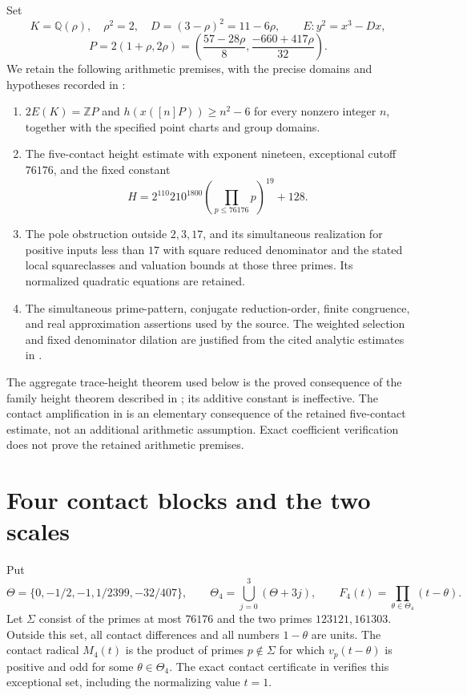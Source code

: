 \documentclass[11pt,a4paper]{article}
\newcommand{\Q}{\mathbb Q}\newcommand{\Z}{\mathbb Z}\newcommand{\HH}{\mathcal H}
\begin{document}
Set
\[
 K=\Q(\rho),\quad \rho^2=2,\quad D=(3-\rho)^2=11-6\rho,
 \qquad E:y^2=x^3-Dx,
\]
\[
 P=2(1+\rho,2\rho)
 =\left(\frac{57-28\rho}{8},\frac{-660+417\rho}{32}\right).
\]
We retain the following arithmetic premises, with the precise domains
and hypotheses recorded in \cite{Dependencies,Source,Weights}:
\begin{enumerate}
\item $2E(K)=\Z P$ and $h(x([n]P))\ge n^2-6$ for every nonzero
integer $n$, together with the specified point charts and group domains.
\item The five-contact height estimate with exponent nineteen,
exceptional cutoff $76176$, and the fixed constant
\[
 H=2^{110}210^{1800}\left(\prod_{p\le76176}p\right)^{19}+128.
\]
\item The pole obstruction outside $2,3,17$, and its simultaneous
realization for positive inputs less than $17$ with square reduced
denominator and the stated local squareclasses and valuation bounds
at those three primes. Its normalized quadratic equations are retained.
\item The simultaneous prime-pattern, conjugate reduction-order,
finite congruence, and real approximation assertions used by the source.
The weighted selection and fixed denominator dilation are justified
from the cited analytic estimates in \cite{Selection}.
\end{enumerate}
The aggregate trace-height theorem used below is the proved consequence
of the family height theorem described in \cite{Aggregate}; its additive
constant is ineffective. The contact amplification in \cite{Contacts}
is an elementary consequence of the retained five-contact estimate,
not an additional arithmetic assumption. Exact coefficient verification
does not prove the retained arithmetic premises.

\section{Four contact blocks and the two scales}
Put
\[
 \Theta=\{0,-1/2,-1,1/2399,-32/407\},\qquad
 \Theta_4=\bigcup_{j=0}^3(\Theta+3j),\qquad
 F_4(t)=\prod_{\theta\in\Theta_4}(t-\theta).
\]
Let $\Sigma$ consist of the primes at most $76176$ and the two primes
$123121,161303$. Outside this set, all contact differences and all
numbers $1-\theta$ are units. The contact radical $M_4(t)$ is the
product of primes $p\notin\Sigma$ for which
$v_p(t-\theta)$ is positive and odd for some $\theta\in\Theta_4$.
The exact contact certificate in \cite{Contacts} verifies this
exceptional set, including the normalizing value $t=1$.
\end{document}

